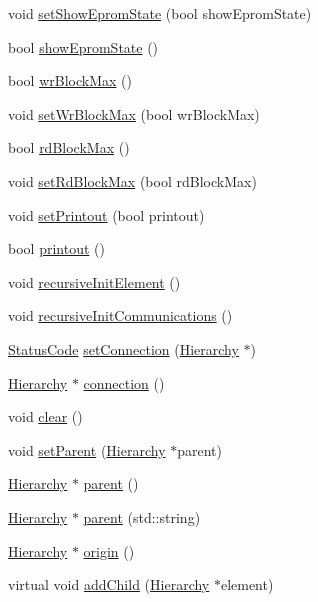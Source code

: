 \begin{DoxyCompactItemize}
void \hyperlink{classUsbFTInterface_aff0c9289dfd34e05e472f2f115f78a01}{setShowEpromState} (bool showEpromState)
\item 
bool \hyperlink{classUsbFTInterface_a6e9b97244aaac289792fbef24daad33e}{showEpromState} ()
\item 
bool \hyperlink{classUsbFTInterface_ad73d2d990fdda96ee53566daaeb73abc}{wrBlockMax} ()
\item 
void \hyperlink{classUsbFTInterface_ab2e58c22979ffa60adf609eca2af78d3}{setWrBlockMax} (bool wrBlockMax)
\item 
bool \hyperlink{classUsbFTInterface_a9f213ab1804e61af476bbdd3ade2d053}{rdBlockMax} ()
\item 
void \hyperlink{classUsbFTInterface_a63615ac245f36dc6a298228d8dcd31c4}{setRdBlockMax} (bool rdBlockMax)
\item 
void \hyperlink{classUsbFTInterface_a6f31debb1d94a65deb3acb72e3608f27}{setPrintout} (bool printout)
\item 
bool \hyperlink{classUsbFTInterface_ad312ac511dfb57c513f2998de396ba9b}{printout} ()
\item 
void \hyperlink{classElement_a3c0abcb36f8906688bb7e32608df7086}{recursiveInitElement} ()
\item 
void \hyperlink{classElement_a82119ed37dff76508a2746a853ec35ba}{recursiveInitCommunications} ()
\item 
\hyperlink{classStatusCode}{StatusCode} \hyperlink{classElement_ab476b4b1df5954141ceb14f072433b89}{setConnection} (\hyperlink{classHierarchy}{Hierarchy} $\ast$)
\item 
\hyperlink{classHierarchy}{Hierarchy} $\ast$ \hyperlink{classElement_af57444353c1ddf9fa0109801e97debf7}{connection} ()
\item 
void \hyperlink{classHierarchy_af4d43b0765b402670eed2d62c73405af}{clear} ()
\item 
void \hyperlink{classHierarchy_a585ad1aeec16077a0e532ab8b4fc557b}{setParent} (\hyperlink{classHierarchy}{Hierarchy} $\ast$parent)
\item 
\hyperlink{classHierarchy}{Hierarchy} $\ast$ \hyperlink{classHierarchy_a1c7bec8257e717f9c1465e06ebf845fc}{parent} ()
\item 
\hyperlink{classHierarchy}{Hierarchy} $\ast$ \hyperlink{classHierarchy_ad550588733bf75ac5c0fcfd7c8fd11a6}{parent} (std::string)
\item 
\hyperlink{classHierarchy}{Hierarchy} $\ast$ \hyperlink{classHierarchy_aee461dc930ce3871636ff87f075b1b83}{origin} ()
\item 
virtual void \hyperlink{classHierarchy_ad677774ff38fcb257c04a3a10d471fac}{addChild} (\hyperlink{classHierarchy}{Hierarchy} $\ast$element)

\end{DoxyCompactItemize}
